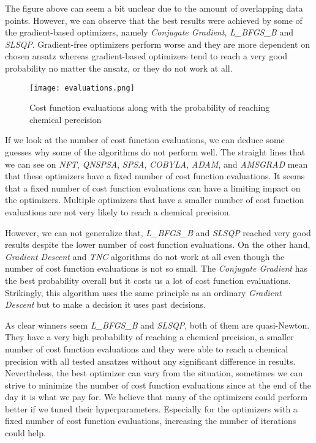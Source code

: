 The figure above can seem a bit unclear due to the amount of overlapping data points. However, we can observe that the best results were achieved by some of the gradient-based optimizers, namely \textit{Conjugate Gradient}, \textit{L\_BFGS\_B} and \textit{SLSQP}. Gradient-free optimizers perform worse and they are more dependent on chosen ansatz whereas gradient-based optimizers tend to reach a very good probability no matter the ansatz, or they do not work at all. 

\begin{figure}[H]
    \centering
    \texttt{[image: evaluations.png]}
    \caption{Cost function evaluations along with the probability of reaching chemical perecision}
    \label{fig:evaluations}
\end{figure}

If we look at the number of cost function evaluations, we can deduce some guesses why some of the algorithms do not perform well. The straight lines that we can see on \textit{NFT}, \textit{QNSPSA}, \textit{SPSA}, \textit{COBYLA}, \textit{ADAM}, and \textit{AMSGRAD} mean that these optimizers have a fixed number of cost function evaluations. It seems that a fixed number of cost function evaluations can have a limiting impact on the optimizers. Multiple optimizers that have a smaller number of cost function evaluations are not very likely to reach a chemical precision.

However, we can not generalize that, \textit{L\_BFGS\_B} and \textit{SLSQP} reached very good results despite the lower number of cost function evaluations. On the other hand, \textit{Gradient Descent} and \textit{TNC} algorithms do not work at all even though the number of cost function evaluations is not so small. The \textit{Conjugate Gradient} has the best probability overall but it costs us a lot of cost function evaluations. Strikingly, this algorithm uses the same principle as an ordinary \textit{Gradient Descent} but to make a decision it uses past decisions.

As clear winners seem \textit{L\_BFGS\_B} and \textit{SLSQP}, both of them are quasi-Newton. They have a very high probability of reaching a chemical precision, a smaller number of cost function evaluations and they were able to reach a chemical precision with all tested ansatzes without any significant difference in results. Nevertheless, the best optimizer can vary from the situation, sometimes we can strive to minimize the number of cost function evaluations since at the end of the day it is what we pay for. We believe that many of the optimizers could perform better if we tuned their hyperparameters. Especially for the optimizers with a fixed number of cost function evaluations, increasing the number of iterations could help.


